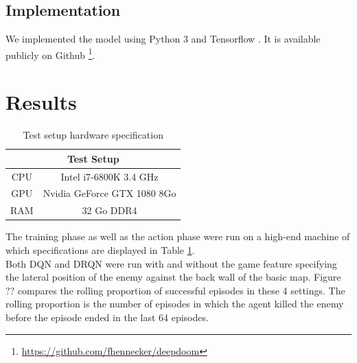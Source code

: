\documentclass[letterpaper]{article}
\newcommand\Tstrut{\rule{0pt}{2.6ex}}
\begin{document}
\subsection{Implementation}
We implemented the model using Python 3 and Tensorflow \citep{tensorflow}.
It is available publicly on Github
\footnote{\url{https://github.com/fhennecker/deepdoom}}.



\section{Results}
%

\begin{table}[h]
\centering
\begin{tabular}{cc}
\multicolumn{2}{c}{Test Setup}                         \Tstrut\\ \hline
\multicolumn{1}{c|}{CPU} & Intel i7-6800K 3.4 GHz      \Tstrut\\
\multicolumn{1}{c|}{GPU} & Nvidia GeForce GTX 1080 8Go \Tstrut\\
\multicolumn{1}{c|}{RAM} & 32 Go DDR4                      \Tstrut
\end{tabular}
\caption{Test setup hardware specification}
\label{tab:specs}
\end{table}

The training phase as well as the action phase were run on a high-end machine
of which specifications are displayed in Table \ref{tab:specs}.\\

Both DQN and DRQN were run with and without the game feature specifying the 
lateral position of the enemy against the back wall of the basic map. Figure
??  compares the rolling proportion of successful episodes
in these 4 settings. The rolling proportion is the number of episodes in which
the agent killed the enemy before the episode ended in the last 64 episodes.
\end{document}
